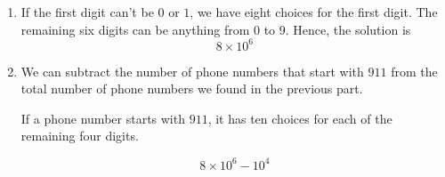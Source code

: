 \begin{enumerate}[label=(\alph*)]
\item If the first digit can't be $0$ or $1$, we have eight choices for the first digit. The remaining six digits can be anything from $0$ to $9$. Hence, the solution is
  $$ 8 \times 10^{6}$$

\item We can subtract the number of phone numbers that start with $911$ from the total number of phone numbers we found in the previous part. 

If a phone number starts with $911$, it has ten choices for each of the remaining four digits.

  $$ 8 \times 10^{6} - 10^{4} $$
\end{enumerate}